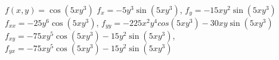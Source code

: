 {$f(x,y) = \cos(5xy^3)$
}
{$f_x=-5y^3\sin(5xy^3)$, $f_y=-15xy^2\sin(5xy^3)$\\
$f_{xx}=-25y^6\cos(5xy^3)$, $f_{yy}=-225x^2y^4cos(5xy^3)-30xy\sin(5xy^3)$\\
$f_{xy}=-75xy^5\cos(5xy^3)-15y^2\sin(5xy^3)$, $f_{yx}=-75xy^5\cos(5xy^3)-15y^2\sin(5xy^3)$\\
}